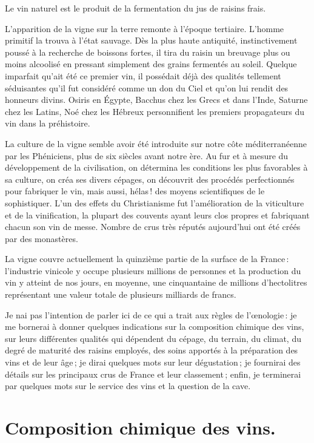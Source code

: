 Le vin naturel est le produit de la fermentation du jus de raisins frais.

L'apparition de la vigne sur la terre remonte à l'époque tertiaire. L'homme
primitif la trouva à l'état sauvage. Dès la plus haute antiquité,
instinctivement poussé à la recherche de boissons fortes, il tira du raisin un
breuvage plus ou moins alcoolisé en pressant simplement des grains fermentés au
soleil. Quelque imparfait qu'ait été ce premier vin, il possédait déjà des
qualités tellement séduisantes qu'il fut considéré comme un don du Ciel et
qu'on lui rendit des honneurs divins. Osiris en Égypte, Bacchus chez les Grecs
et dans l'Inde, Saturne chez les Latins, Noé chez les Hébreux personnifient les
premiers propagateurs du vin dans la préhistoire.

La culture de la vigne semble avoir été introduite sur notre côte
méditerranéenne par les Phéniciens, plus de six siècles avant notre ère. Au fur
et à mesure du développement de la civilisation, on détermina les conditions
les plus favorables à sa culture, on créa ses divers cépages, on découvrit des
procédés perfectionnés pour fabriquer le vin, mais aussi, hélas ! des moyens
scientifiques de le sophistiquer. L'un des effets du Christianisme fut
l'amélioration de la viticulture et de la vinification, la plupart des couvents
ayant leurs clos propres et fabriquant chacun son vin de messe. Nombre de crus
très réputés aujourd'hui ont été créés par des monastères.

La vigne couvre actuellement la quinzième partie de la surface de la France :
l'industrie vinicole y occupe plusieurs millions de personnes et la production
du vin y atteint de nos jours, en moyenne, une cinquantaine de millions
d'hectolitres représentant une valeur totale de plusieurs milliards de francs.

Je nai pas l'intention de parler ici de ce qui a trait aux règles de
l'œnologie : je me bornerai à donner quelques indications sur la composition
chimique des vins, sur leurs différentes qualités qui dépendent du cépage, du
terrain, du climat, du degré de maturité des raisins employés, des soins
apportés à la préparation des vins et de leur âge ; je dirai quelques mots sur
leur dégustation ; je fournirai des détails sur les principaux crus de France
et leur classement ; enfin, je terminerai par quelques mots sur le service des
vins et la question de la cave.

\section*{\centering Composition chimique des vins.}

